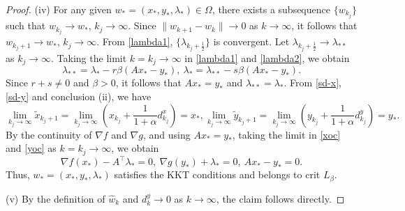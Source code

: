 \documentclass[10pt,a4paper]{amsart}
\begin{document}
\begin{proof}
(iv) For any given $w_*=(x_*,y_*,\lambda_*)\in\Omega$, there exists a subsequence $\{w_{k_j}\}$ such that $w_{k_j} \to w_*$, $k_j \to \infty$. Since $\|w_{k+1}-w_k\|\to 0$ as $k\to\infty$, it follows that $w_{k_j+1} \to w_*$, $k_j \to \infty$. From \eqref{lambda1}, $\{\lambda_{{k_j}+\frac{1}{2}}\}$ is convergent.
Let $\lambda_{{k_j}+\frac{1}{2}} \to \lambda_{**}$ as $k_j\to \infty$. Taking the limit $k={k_j}\to \infty$ in \eqref{lambda1} and \eqref{lambda2}, we obtain
\[\lambda_{**}=\lambda_{*}-r\beta(Ax_*-y_*),~\lambda_{*}=\lambda_{**}-s\beta(Ax_*-y_*).\]
Since $r+s\not=0$ and $\beta>0$, it follows that $Ax_*=y_*$ and $\lambda_{**}=\lambda_{*}$.
From \eqref{sd-x}, \eqref{sd-y} and conclusion (ii), we have
\[\lim\limits_{k_j\to \infty}\tilde{x}_{{k_j}+1}=\lim\limits_{k_j\to \infty}(x_{k_j}+\frac{1}{1+\alpha}d_{k_j}^x)=x_*,
\lim\limits_{k_j\to \infty}\tilde{y}_{{k_j}+1}=\lim\limits_{k_j\to \infty}(y_{k_j}+\frac{1}{1+\alpha}d_{k_j}^y)=y_*.\]
By the continuity of $\nabla f$ and $\nabla g$, and using $Ax_*=y_*$, taking the limit in \eqref{xoc} and \eqref{yoc} as $k=k_j\to \infty$, we obtain
\[
\nabla f(x_*)-A^{\top}\lambda_*=0,~\nabla g(y_*)+\lambda_*=0,~Ax_*-y_*=0.
\]
Thus, $w_*=(x_*,y_*,\lambda_*)$ satisfies the KKT conditions and belongs to crit $L_\beta$.

(v) By the definition of $\hat{w}_k$ and $d_k^y \to 0$ as $k \to \infty$, the claim follows directly.
\end{proof}
\end{document}
